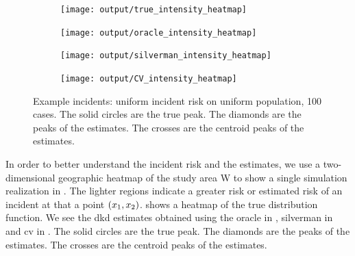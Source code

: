 \begin{figure}[htbp]
    \centering
    \begin{subfigure}[t]{0.45\textwidth}
        \texttt{[image: output/true\_intensity\_heatmap]}
        \label{fig:cases_heatmap:unif_100_1.0_1h:true}
    \end{subfigure}%
    \begin{subfigure}[t]{0.45\textwidth}
        \texttt{[image: output/oracle\_intensity\_heatmap]}
        \label{fig:cases_heatmap:unif_100_1.0_1h:oracle}
    \end{subfigure}

    \begin{subfigure}[b]{0.45\textwidth}
        \texttt{[image: output/silverman\_intensity\_heatmap]}
        \label{fig:cases_heatmap:unif_100_1.0_1h:silverman}
    \end{subfigure}%
    \begin{subfigure}[b]{0.45\textwidth}
        \texttt{[image: output/CV\_intensity\_heatmap]}
        \label{fig:cases_heatmap:unif_100_1.0_1h:cv}
    \end{subfigure}
    \caption[Example incidents: uniform incident risk on uniform population, 100 cases]
        {Example incidents: uniform incident risk on uniform population, 100 cases. The solid circles are the true peak. The diamonds are the peaks of the estimates. The crosses are the centroid peaks of the estimates.}
    \label{fig:cases_heatmap:unif_100_1.0_1h}
\end{figure}

In order to better understand the incident risk and the estimates,
we use a two-dimensional geographic heatmap of the study area \gls{W} to show a single simulation realization in
.
The lighter regions indicate a greater risk or estimated risk of an incident at that a point $(x_1, x_2)$.
 shows a heatmap of the true distribution function.
We see the \gls{dkd} estimates obtained using the \gls{oracle} in ,
\gls{silverman} in  and \gls{cv} in .
The solid circles are the true peak.
The diamonds are the peaks of the estimates.
The crosses are the centroid peaks of the estimates.

